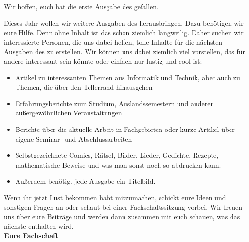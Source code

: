 Wir hoffen, euch hat die erste Ausgabe des \nameit \space gefallen.

Dieses Jahr wollen wir weitere Ausgaben des \nameit \space herausbringen. Dazu benötigen wir eure Hilfe. Denn ohne Inhalt ist das \nameit \space schon ziemlich langweilig. Daher suchen wir interessierte Personen, die uns dabei helfen, tolle Inhalte für die nächsten Ausgaben des \nameit \space zu erstellen. Wir können uns dabei ziemlich viel vorstellen, das für andere interessant sein könnte oder einfach nur lustig und cool ist:

\begin{itemize}
	\item Artikel zu interessanten Themen aus Informatik und Technik, aber auch zu Themen, die über den Tellerrand hinausgehen
	\item Erfahrungsberichte zum Studium, Auslandssemestern und anderen außergewöhnlichen Veranstaltungen
	\item Berichte über die aktuelle Arbeit in Fachgebieten oder kurze Artikel über eigene Seminar- und Abschlussarbeiten
	\item Selbstgezeichnete Comics, Rätsel, Bilder, Lieder, Gedichte, Rezepte, mathematische Beweise und was man sonst noch so abdrucken kann.
	\item Außerdem benötigt jede Ausgabe ein Titelbild.
\end{itemize}

Wenn ihr jetzt Lust bekommen habt mitzumachen, schickt eure Ideen und sonstigen Fragen an  oder schaut bei einer Fachschaftssitzung vorbei. Wir freuen uns über eure Beiträge und werden dann zusammen mit euch schauen, was das nächste \nameit \space enthalten wird.\\

\large
\textbf{Eure Fachschaft}
\normalsize